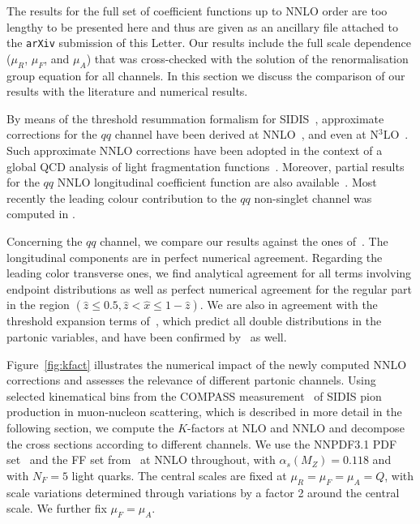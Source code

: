 \documentclass[10pt,aps,prl,twocolumn,preprintnumbers,nofootinbib]{revtex4-2}
\newcommand{\code}[1]{\texttt{#1}}
\begin{document}
The results for the full set of coefficient functions up to NNLO order are too
lengthy to be presented here and thus are given as an ancillary file attached to
the \code{arXiv} submission of this Letter.  Our results include the full scale
dependence ($\mu_R$, $\mu_F$, and $\mu_A$) that was cross-checked with the
solution of the renormalisation group equation for all channels.  In this
section we discuss the comparison of our results with the literature and
numerical results.

By means of the threshold resummation formalism for SIDIS~\cite{Anderle:2012rq},
approximate corrections for the $qq$ channel have been derived at
NNLO~\cite{Abele:2021nyo}, and even at N$^3$LO~\cite{Abele:2022wuy}.
%
Such approximate NNLO corrections have been adopted in the context of a global
QCD analysis of light fragmentation
functions~\cite{Borsa:2022vvp,AbdulKhalek:2022laj}.
%
Moreover, partial results for the $qq$ NNLO longitudinal coefficient function
are also available~\cite{Anderle:2016kwa}.
%
Most recently the leading colour contribution to the $qq$ non-singlet channel
was computed in \cite{Goyal:2023xfi}.

Concerning the $qq$ channel, we compare our results against the ones
of~\cite{Goyal:2023xfi}.  The longitudinal components are in perfect numerical
agreement.  Regarding the leading color transverse ones, we find analytical
agreement for all terms involving endpoint distributions as well as perfect
numerical agreement for the regular part in the region $(\hat{z}\leq 0.5,
\hat{z}<\hat{x}\leq 1-\hat{z})$.  We are also in agreement with the threshold
expansion terms of~\cite{Abele:2021nyo}, which predict all double distributions
in the partonic variables, and have been confirmed by~\cite{Goyal:2023xfi} as
well.


Figure~\ref{fig:kfact} illustrates the numerical impact of the newly computed
NNLO corrections and assesses the relevance of different partonic channels.
Using selected kinematical bins from the COMPASS
measurement~\cite{COMPASS:2016xvm} of SIDIS pion production in muon-nucleon
scattering, which is described in more detail in the following section, we
compute the $K$-factors at NLO and NNLO and decompose the cross sections
according to different channels. We use the NNPDF3.1 PDF
set~\cite{NNPDF:2017mvq} and the FF set from~\cite{Borsa:2022vvp} at NNLO
throughout, with $\alpha_s(M_Z)=0.118$ and with $N_F = 5$ light quarks. The
central scales are fixed at $\mu_R=\mu_F=\mu_A=Q$, with scale variations
determined through variations by a factor 2 around the central scale.  We
further fix $\mu_F=\mu_A$.
\end{document}
